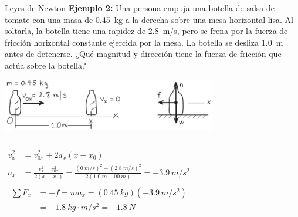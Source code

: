 \documentclass[9pt, aspectratio=169]{beamer}
\begin{document}
\begin{frame}{Leyes de Newton}
    \textbf{Ejemplo 2:} Una persona empuja una botella de salsa de tomate con una masa de \qty{0.45}{kg} a la derecha sobre una mesa horizontal lisa. Al soltarla, la botella tiene una rapidez de \qty{2.8}{m/s}, pero se frena por la fuerza de fricción horizontal constante ejercida por la mesa. La botella se desliza \qty{1.0}{m} antes de detenerse. ¿Qué magnitud y dirección tiene la fuerza de fricción que actúa sobre la botella?

\begin{center} 
    \includegraphics[width=0.7\textwidth]{figs/fig-08.png}
\end{center}
\pause 

\begin{columns}[t]
\cx 
\begin{align*}
    v_x^2 &= v_{0x}^2 + 2 a_x(x - x_0) \\
    a_x &= \frac{v_x^2 - v_{0x}^2}{2(x - x_0)} = \frac{(\qty{0}{m/s})^2 - (\qty{2.8}{m/s})^2}{2(\qty{1.0}{m} - 0\qty{0}{m})} = \qty{-3.9}{m/s^2} \\
\end{align*}
\cx 
\begin{align*}
    \sum F_x &= -f = m a_x = (\qty{0.45}{kg}) (\qty{-3.9}{m/s^2}) \\
             &= \qty{-1.8}{kg \cdot m/s^2} = \qty{-1.8}{N}
\end{align*}
\end{columns}
\end{frame}
\end{document}
